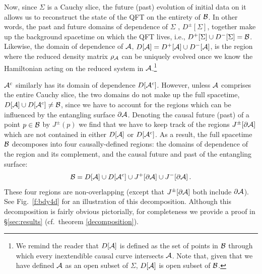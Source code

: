 \documentclass[12pt]{article}
\def\bdy{{\cal B}}
\def\regA{{\cal A}}
\def\regAc{{\cal A}^c}
\def\rhoA{{\rho_{\regA}}}
\def\entsurf{
\partial \regA}
\def\domdA{D[\regA]}
\def\domdAc{D[\regAc]}
\begin{document}
Now, since $\Sigma$ is a Cauchy slice, the future (past) evolution of initial data on it allows us to reconstruct the state of the QFT on the entirety of ${\cal B}$. In other words, the past and future domains of dependence of $\Sigma$ , $D^\pm[\Sigma]$, together make up the background spacetime on which the QFT lives, i.e., 
$D^+[\Sigma] \cup D^-[\Sigma] = \bdy$. 
Likewise,  the domain of dependence of $\regA$,  $\domdA = D^+[\regA] \cup D^-[\regA]$,  is the region where the reduced density matrix $\rhoA$ can be uniquely evolved once we know the Hamiltonian acting on the reduced system in $\regA$.\footnote{ We remind the reader that $D[\regA]$ is defined as the set of points in $\bdy$ through which every inextendible causal curve intersects $\regA$. Note that, given that we have defined $\regA$ as an open subset of $\Sigma$, $D[\regA]$ is open subset of $\bdy$.}

$\regAc$ similarly has its domain of dependence $\domdAc$. However, unless $\regA$ comprises the entire Cauchy slice, the two domains do not make up the full spacetime, $\domdA \cup \domdAc\neq \bdy$, since we have to account for the regions which can be influenced by the entangling surface $\entsurf$. Denoting the causal  future (past) of a point $p\in {\cal B}$ by $J^\pm(p)$ 
we find that we have to keep track of the regions $J^\pm[\entsurf]$ which are not contained in either $\domdA$ or $\domdAc$. As a result, the  full spacetime $\bdy$ decomposes into four causally-defined regions: the domains of dependence of the region and its complement, and the causal future and past of the entangling surface:
%
\begin{equation}
\bdy = \domdA \cup \domdAc \cup J^+[\entsurf] \cup J^-[\entsurf]\,.
\label{bdy4d}
\end{equation}	
% 
These four regions are non-overlapping (except that $J^\pm[\partial\regA]$ both include $\partial\regA$). See Fig.~\ref{f:bdy4d} for an illustration of this decomposition. 
Although this decomposition is fairly obvious pictorially, for completeness we provide a proof in \S\ref{sec:results} (cf.\ theorem \ref{decomposition}).
\end{document}
